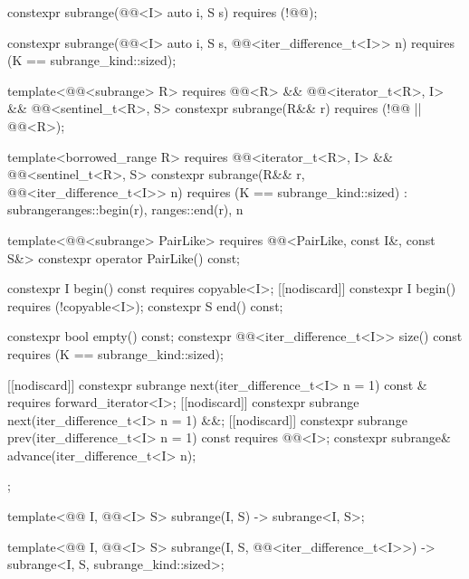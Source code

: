\begin{codeblock}
{{    constexpr subrange(@@<I> auto i, S s) requires (!@@);

    constexpr subrange(@@<I> auto i, S s,
                       @@<iter_difference_t<I>> n)
      requires (K == subrange_kind::sized);

    template<@@<subrange> R>
      requires @@<R> &&
               @@<iterator_t<R>, I> &&
               @@<sentinel_t<R>, S>
    constexpr subrange(R&& r) requires (!@@ || @@<R>);

    template<borrowed_range R>
      requires @@<iterator_t<R>, I> &&
               @@<sentinel_t<R>, S>
    constexpr subrange(R&& r, @@<iter_difference_t<I>> n)
      requires (K == subrange_kind::sized)
        : subrange{ranges::begin(r), ranges::end(r), n}
    {}

    template<@@<subrange> PairLike>
      requires @@<PairLike, const I&, const S&>
    constexpr operator PairLike() const;

    constexpr I begin() const requires copyable<I>;
    [[nodiscard]] constexpr I begin() requires (!copyable<I>);
    constexpr S end() const;

    constexpr bool empty() const;
    constexpr @@<iter_difference_t<I>> size() const
      requires (K == subrange_kind::sized);

    [[nodiscard]] constexpr subrange next(iter_difference_t<I> n = 1) const &
      requires forward_iterator<I>;
    [[nodiscard]] constexpr subrange next(iter_difference_t<I> n = 1) &&;
    [[nodiscard]] constexpr subrange prev(iter_difference_t<I> n = 1) const
      requires @@<I>;
    constexpr subrange& advance(iter_difference_t<I> n);
  };

  template<@@ I, @@<I> S>
    subrange(I, S) -> subrange<I, S>;

  template<@@ I, @@<I> S>
    subrange(I, S, @@<iter_difference_t<I>>) ->
      subrange<I, S, subrange_kind::sized>;

}
\end{codeblock}
